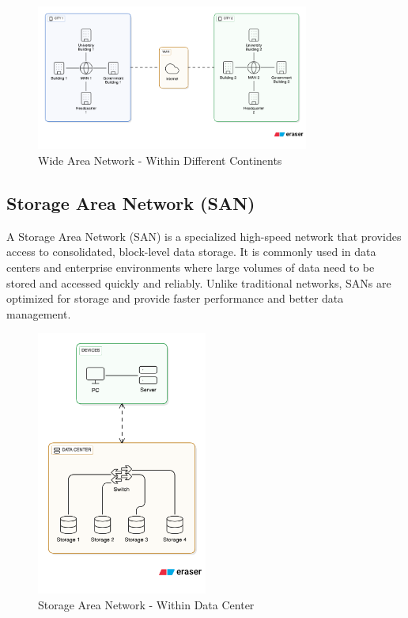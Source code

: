 \begin{figure}[H]
    \centering
    \includegraphics[width=0.8\textwidth]{images/chapter2/wan.png}
    \caption{Wide Area Network - Within Different Continents}
    \label{fig:wan}
\end{figure}

\subsection{Storage Area Network (SAN)}
A Storage Area Network (SAN) is a specialized high-speed network that provides access to consolidated, block-level data storage. It is commonly used in data centers and enterprise environments where large volumes of data need to be stored and accessed quickly and reliably. Unlike traditional networks, SANs are optimized for storage and provide faster performance and better data management.

\begin{figure}[H]
    \centering
    \includegraphics[width=0.5\textwidth]{images/chapter2/san.png}
    \caption{Storage Area Network - Within Data Center}
    \label{fig:san}
\end{figure}


